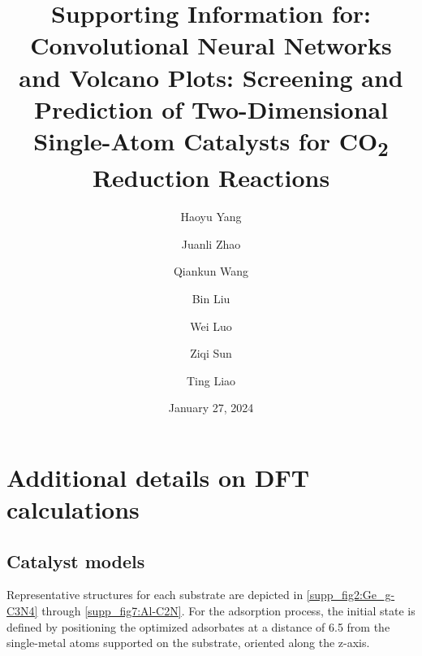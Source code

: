 \documentclass[a4paper, 12pt]{article}
\begin{document}


\title{Supporting Information for:  \\
Convolutional Neural Networks and Volcano Plots:
Screening and Prediction of Two-Dimensional Single-Atom Catalysts for CO\textsubscript{2} Reduction Reactions}

\author[1]{Haoyu Yang}
\author[2]{Juanli Zhao}
\author[3]{Qiankun Wang}
\author[2]{Bin Liu}
\author[4]{Wei Luo}
\author[1,*]{Ziqi Sun}
\author[5,*]{Ting Liao}


\date{January 27, 2024}

\maketitle


\newpage
\section{Additional details on DFT calculations}

\subsection{Catalyst models}
\label{supp_sec2.1_catalysts}

Representative structures for each substrate are depicted in \cref{supp_fig2:Ge_g-C3N4} through \cref{supp_fig7:Al-C2N}. For the adsorption process, the initial state is defined by positioning the optimized adsorbates at a distance of 6.5 \text{\AA} from the single-metal atoms supported on the substrate, oriented along the z-axis.
\end{document}
